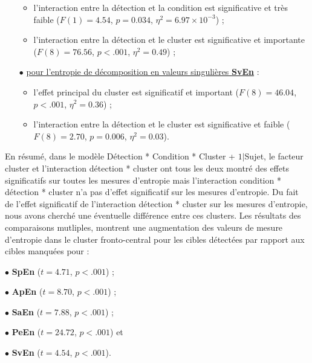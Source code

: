 \begin{itemize}
\begin{itemize}
\item l'interaction entre la détection et la condition est significative et très faible ($F(1)=4.54$, $p=0.034$, $\eta^2=6.97\times10^{-3}$) ; 
\item l'interaction entre la détection et le cluster est significative et importante ($F(8)=76.56$, $p<.001$, $\eta^2=0.49$) ; 
\end{itemize}
\item[$\bullet$] \underline{pour l'entropie de décomposition en valeurs singulières \textbf{SvEn}} :
\begin{itemize} 
\item l'effet principal du cluster est significatif et important ($F(8)=46.04$, $p<.001$, $\eta^2=0.36$) ; 
\item l'interaction entre la détection et le cluster est significative et faible ($F(8)=2.70$, $p=0.006$, $\eta^2=0.03$). \\
\end{itemize}
\end{itemize}

En résumé, dans le modèle Détection * Condition * Cluster + $1|$Sujet, le facteur cluster et l'interaction détection * cluster ont tous les deux montré des effets significatifs sur toutes les mesures d'entropie mais l'interaction condition * détection * cluster n'a pas d'effet significatif sur les mesures d'entropie. 
Du fait de l'effet significatif de l'interaction détection * cluster sur les mesures d'entropie, nous avons cherché une éventuelle différence entre ces clusters. 
Les résultats des comparaisons mutliples, montrent une augmentation des valeurs de mesure d'entropie dans le cluster fronto-central pour les cibles détectées par rapport aux cibles manquées pour : 

\begin{itemize}
\begin{multicols}{2}
\item[$\bullet$] \textbf{SpEn} ($t=4.71$, $p<.001$) ; 
\item[$\bullet$] \textbf{ApEn} ($t=8.70$, $p<.001$) ; 
\item[$\bullet$] \textbf{SaEn} ($t=7.88$, $p<.001$) ; 
\item[$\bullet$] \textbf{PeEn} ($t=24.72$, $p<.001$) et 
\item[$\bullet$] \textbf{SvEn} ($t=4.54$, $p<.001$). 
\end{multicols}
\end{itemize}


